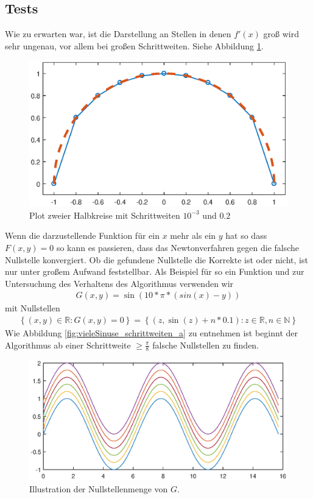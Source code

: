 \documentclass[a4paper,11pt,bibliography=totoc,listof=totoc,headinclude=true,cleardoublepage=empty,oneside]{scrartcl}
\begin{document}
\subsection{Tests}
Wie zu erwarten war, ist die Darstellung an Stellen in denen $f'(x)$ groß wird sehr ungenau, vor allem bei großen Schrittweiten. Siehe Abbildung \ref{fig:Halbkreis_a}.
\begin{figure}[h]
\centering
\includegraphics[width=0.85\linewidth]{plots/A/Halbkreis.eps}
\caption{Plot zweier Halbkreise mit Schrittweiten $10^{-3}$ und $0.2$}
\label{fig:Halbkreis_a}
\end{figure}
Wenn die darzustellende Funktion für ein $x$ mehr als ein $y$ hat so dass $F(x,y)=0$ so kann es passieren, dass das Newtonverfahren gegen die falsche Nullstelle konvergiert. Ob die gefundene Nullstelle die Korrekte ist oder nicht, ist nur unter großem Aufwand feststellbar. Als Beispiel für so ein Funktion und zur Untersuchung des Verhaltens des Algorithmus verwenden wir
\begin{align*}
G(x,y) = \sin(10*\pi*(sin(x)-y))
\end{align*}
mit Nullstellen
\begin{align*}
\left\lbrace (x,y)\in\mathbb{R}: G(x,y)=0 \right\rbrace = \left\lbrace (z, \sin(z)+n*0.1): z \in \mathbb{R}, n \in \mathbb{N} \right\rbrace
\end{align*}
Wie Abbildung \ref{fig:vieleSinuse_schrittweiten_a} zu entnehmen ist beginnt der Algorithmus ab einer Schrittweite $\geq \frac{\pi}{8}$ falsche Nullstellen zu finden.
\begin{figure}[h]
\centering
\includegraphics[width=0.85\linewidth]{plots/A/vieleSinuse.eps}
\caption{Illustration der Nullstellenmenge von $G$.}
\label{fig:vieleSinuse_a}
\end{figure}
\end{document}
